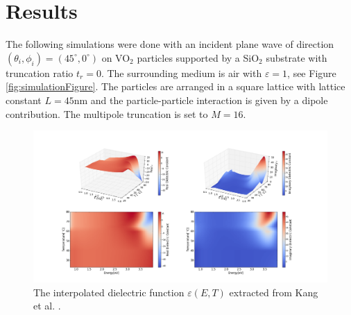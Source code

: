 \section{\textbf{Results}}
The following simulations were done with an incident plane wave of direction 
$(\theta_i,\phi_i) = (45^{\circ},0^{\circ})$ on VO$_2$ particles supported by a SiO$_2$ substrate
with truncation ratio $t_r = 0$. The surrounding medium is air with $\varepsilon = 1$,
see Figure \ref{fig:simulationFigure}.
The particles are arranged in a square lattice with lattice constant $L = 45$nm and the
particle-particle interaction is given by a dipole contribution. The multipole truncation
is set to $M = 16$.
%
\begin{figure}[h!]
    \centering
    \includegraphics[width=1.1\textwidth]{Results/interpPermittivity.png}
    \caption{
       The interpolated dielectric function $\varepsilon(E,T)$ extracted from 
       Kang et al. \cite[p.~3]{Kang2012}.
    }
    \label{fig:DF}
\end{figure}
%
